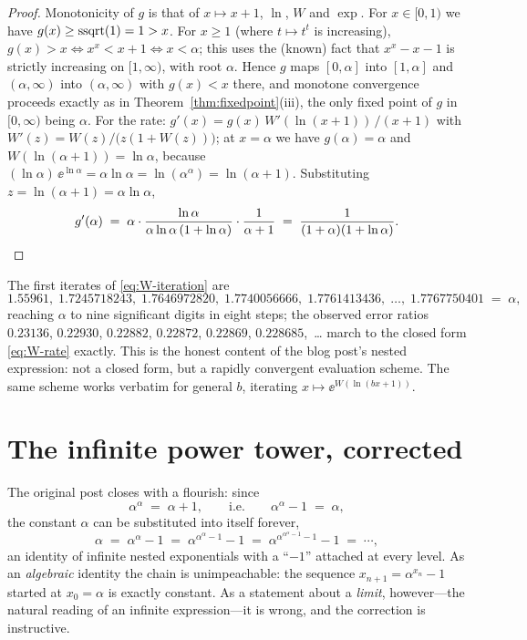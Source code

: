 \begin{proof}
Monotonicity of $g$ is that of $x \mapsto x + 1$, $\ln$, $W$ and
$\exp$. For $x \in [0,1)$ we have $g(x) \ge \operatorname{ssqrt}(1) = 1 > x$. For
$x \ge 1$ (where $t \mapsto t^{t}$ is increasing), $g(x) > x \iff
x^{x} < x + 1 \iff x < \alpha$; this uses the (known) fact that
$x^{x} - x - 1$ is strictly increasing on $[1,\infty)$, with root
$\alpha$. Hence $g$ maps $[0, \alpha]$ into $[1, \alpha]$ and
$(\alpha, \infty)$ into $(\alpha, \infty)$ with $g(x) < x$ there, and
monotone convergence proceeds exactly as in
Theorem~\ref{thm:fixedpoint}(iii), the only fixed point of $g$ in
$[0,\infty)$ being $\alpha$. For the rate:
$g'(x) = g(x)\, W'(\ln(x+1))\,/(x+1)$ with
$W'(z) = W(z)/\bigl(z(1+W(z))\bigr)$; at $x = \alpha$ we have
$g(\alpha) = \alpha$ and $W(\ln(\alpha+1)) = \ln\alpha$, because
$(\ln\alpha)\,\ee^{\ln\alpha} = \alpha\ln\alpha =
\ln(\alpha^{\alpha}) = \ln(\alpha+1)$. Substituting $z = \ln(\alpha+1)
= \alpha \ln \alpha$,
\[
    g'(\alpha)
    \;=\; \alpha \cdot \frac{\ln\alpha}{\alpha\ln\alpha\,
    (1 + \ln\alpha)} \cdot \frac{1}{\alpha + 1}
    \;=\; \frac{1}{(1+\alpha)(1+\ln\alpha)} .
    \qedhere
\]
\end{proof}

The first iterates of \eqref{eq:W-iteration} are
\[
    1.55961,\; 1.7245718243,\; 1.7646972820,\; 1.7740056666,\;
    1.7761413436,\; \ldots,\;
    1.7767750401 \;=\; \alpha ,
\]
reaching $\alpha$ to nine significant digits in eight steps; the
observed error ratios $0.23136$, $0.22930$, $0.22882$, $0.22872$,
$0.22869$, $0.228685$,~\ldots{} march to the closed form
\eqref{eq:W-rate} exactly.
This is the honest content of the blog post's nested expression: not
a closed form, but a rapidly convergent evaluation scheme. The same
scheme works verbatim for general $b$, iterating
$x \mapsto \ee^{W(\ln(bx+1))}$.

\section{The infinite power tower, corrected}\label{sec:tower}

The original post closes with a flourish: since
\begin{equation}\label{eq:blog-tower}
    \alpha^{\alpha} \;=\; \alpha + 1,
    \qquad\text{i.e.}\qquad
    \alpha^{\alpha} - 1 \;=\; \alpha ,
\end{equation}
the constant $\alpha$ can be substituted into itself forever,
\[
    \alpha \;=\; \alpha^{\alpha} - 1 \;=\;
    \alpha^{\alpha^{\alpha} - 1} - 1 \;=\;
    \alpha^{\alpha^{\alpha^{\alpha} - 1} - 1} - 1 \;=\; \cdots,
\]
an identity of infinite nested exponentials with a ``$-1$'' attached
at every level. As an \emph{algebraic} identity the chain is
unimpeachable: the sequence $x_{n+1} = \alpha^{x_{n}} - 1$ started at
$x_{0} = \alpha$ is exactly constant. As a statement about a
\emph{limit}, however---the natural reading of an infinite
expression---it is wrong, and the correction is instructive.

